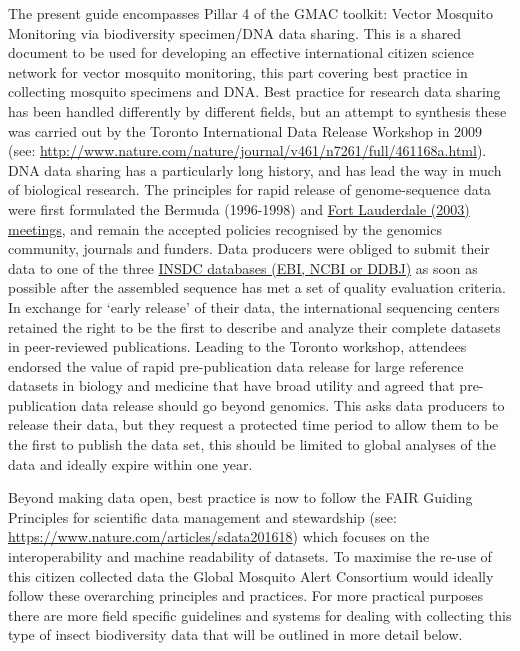 \documentclass[]{article}
\begin{document}
The present guide encompasses Pillar 4 of the GMAC toolkit: Vector Mosquito Monitoring via biodiversity specimen/DNA data sharing. This is a shared document to be used for developing an effective international citizen science network for vector mosquito monitoring, this part covering best practice in collecting mosquito specimens and DNA. Best practice for research data sharing has been handled differently by different fields, but an attempt to synthesis these was carried out by the Toronto International Data Release Workshop in 2009 (see: \url{http://www.nature.com/nature/journal/v461/n7261/full/461168a.html}). DNA data sharing has a particularly long history, and has lead the way in much of biological research. The principles for rapid release of genome-sequence data were first formulated the Bermuda (1996-1998) and \href{https://www.genome.gov/10506537/}{Fort Lauderdale (2003) meetings}, and remain the accepted policies recognised by the genomics community, journals and funders. Data producers were obliged to submit their data to one of the three \href{http://www.insdc.org/}{INSDC databases (EBI, NCBI or DDBJ)} as soon as possible after the assembled sequence has met a set of quality evaluation criteria. In exchange for `early release' of their data, the international sequencing centers retained the right to be the first to describe and analyze their complete datasets in peer-reviewed publications. Leading to the Toronto workshop, attendees endorsed the value of rapid pre-publication data release for large reference datasets in biology and medicine that have broad utility and agreed that pre-publication data release should go beyond genomics. This asks data producers to release their data, but they request a protected time period to allow them to be the first to publish the data set, this should be limited to global analyses of the data and ideally expire within one year.

Beyond making data open, best practice is now to follow the FAIR Guiding Principles for scientific data management and stewardship (see: \url{https://www.nature.com/articles/sdata201618}) which focuses on the interoperability and machine readability of datasets. To maximise the re-use of this citizen collected data the Global Mosquito Alert Consortium would ideally follow these overarching principles and practices. For more practical purposes there are more field specific guidelines and systems for dealing with collecting this type of insect biodiversity data that will be outlined in more detail below.
\end{document}
